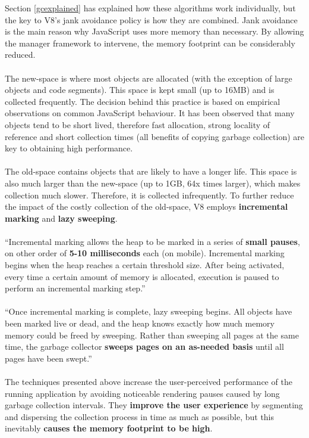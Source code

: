 \documentclass{l4proj}
\begin{document}
Section \ref{gcexplained} has explained how these algorithms work individually, but the key to V8's jank avoidance policy is how they are combined. Jank avoidance is the main reason why JavaScript uses more memory than necessary. By allowing the manager framework to intervene, the memory footprint can be considerably reduced. 
\\\\
\hspace*{1em} The new-space is where most objects are allocated (with the exception of large objects and code segments). This space is kept small (up to 16MB) and is collected frequently. The decision behind this practice is based on empirical observations on common JavaScript behaviour. It has been observed that many objects tend to be short lived, therefore fast allocation, strong locality of reference and short collection times (all benefits of copying garbage collection) are key to obtaining high performance.    
\\\\
\hspace*{1em} The old-space contains objects that are likely to have a longer life. This space is also much larger than the new-space (up to 1GB, 64x times larger), which makes collection much slower. Therefore, it is collected infrequently. To further reduce the impact of the costly collection of the old-space, V8 employs \textbf{incremental marking} and \textbf{lazy sweeping}. 
\\\\
\label{lazyv8}
``Incremental marking allows the heap to be marked in a series of \textbf{small pauses}, on other order of \textbf{5-10 milliseconds} each (on mobile). Incremental marking begins when the heap reaches a certain threshold size. After being activated, every time a certain amount of memory is allocated, execution is paused to perform an incremental marking step.''\cite{v8gctour}
\\\\
``Once incremental marking is complete, lazy sweeping begins. All objects have been marked live or dead, and the heap knows exactly how much memory memory could be freed by sweeping. Rather than sweeping all pages at the same time, the garbage collector \textbf{sweeps pages on an as-needed basis} until all pages have been swept.''\cite{v8gctour}
\\\\
\hspace*{1em} The techniques presented above increase the user-perceived performance of the running application by avoiding noticeable rendering pauses caused by long garbage collection intervals. They \textbf{improve the user experience} by segmenting and dispersing the collection process in time as much as possible, but this inevitably \textbf{causes the memory footprint to be high}.
\end{document}
